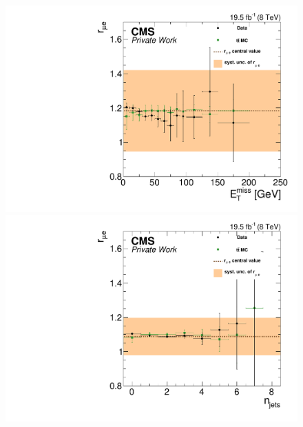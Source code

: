 \begin{figure}[htbp]
\begin{minipage}[t]{0.49\textwidth}
\end{minipage}
\begin{minipage}[t]{0.49\textwidth}
\includegraphics[width=\textwidth]{plots/BG/rmue/rMuE_ZPeakControlForward_Full2012_MET_None.pdf}
\end{minipage}
\begin{minipage}[t]{0.49\textwidth}
  \includegraphics[width=\textwidth]{plots/BG/rmue/rMuE_ZPeakControlCentral_Full2012_NJets_None.pdf}
\end{minipage}
\begin{minipage}[t]{0.49\textwidth}

\end{minipage}
\end{figure}
